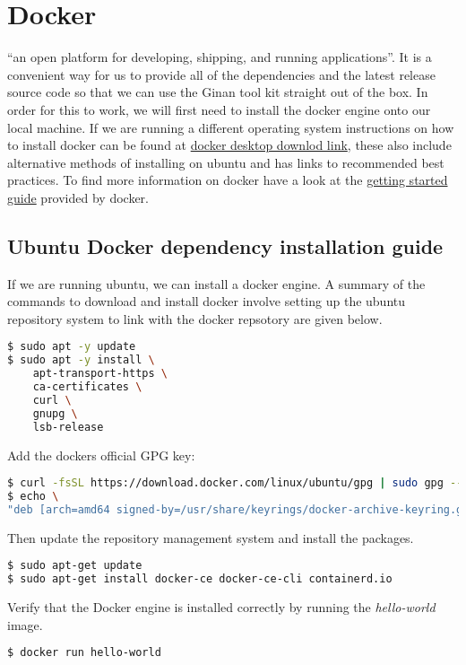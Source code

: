 \chapter{Docker}
\label{ch:docker}
 ``an open platform for developing, shipping, and running applications''. It is a convenient way for us to provide all of the dependencies and the latest release source code so that we can use the Ginan tool kit straight out of the box.
%
In order for this to work, we will first need to install the docker engine onto our local machine. If we are running a different operating system instructions on how to install docker can be found at \href{https://docs.docker.com/get-docker/}{docker desktop downlod link}, these also include alternative methods of installing on ubuntu and has links to recommended best practices.
%
To find more information on docker have a look at the \href{https://docs.docker.com/get-started/}{getting started guide} provided by docker.
%
\section{Ubuntu Docker dependency installation guide}
If we are running ubuntu, we can install a docker engine. A summary of the commands to download and install docker involve setting up the ubuntu repository system to link with the docker repsotory are given below.

\begin{lstlisting}[language=bash]
$ sudo apt -y update
$ sudo apt -y install \
    apt-transport-https \
    ca-certificates \
    curl \
    gnupg \
    lsb-release
\end{lstlisting}

Add the dockers official GPG key:
\begin{lstlisting}[language=bash]
$ curl -fsSL https://download.docker.com/linux/ubuntu/gpg | sudo gpg --dearmor -o /usr/share/keyrings/docker-archive-keyring.gpg
$ echo \
"deb [arch=amd64 signed-by=/usr/share/keyrings/docker-archive-keyring.gpg] https://download.docker.com/linux/ubuntu $(lsb_release -cs) stable" | sudo tee /etc/apt/sources.list.d/docker.list > /dev/null
\end{lstlisting}
%
Then update the repository management system and install the packages.
%
\begin{lstlisting}[language=bash]
$ sudo apt-get update
$ sudo apt-get install docker-ce docker-ce-cli containerd.io
\end{lstlisting}

Verify that the Docker engine is installed correctly by running the \emph{hello-world} image.
\begin{lstlisting}[language=bash]
$ docker run hello-world
\end{lstlisting}

